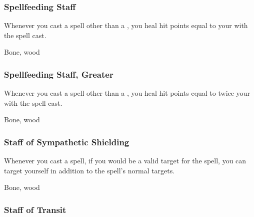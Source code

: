 
\lowercase{\hypertarget{item:Spellfeeding Staff}{}}\label{item:Spellfeeding Staff}
\hypertarget{item:Spellfeeding Staff}{\subsubsection{Spellfeeding Staff\hfill{}}}

Whenever you cast a spell other than a , you heal hit points equal to your  with the spell cast.



 


 Bone, wood


\lowercase{\hypertarget{item:Spellfeeding Staff, Greater}{}}\label{item:Spellfeeding Staff, Greater}
\hypertarget{item:Spellfeeding Staff, Greater}{\subsubsection{Spellfeeding Staff, Greater\hfill{}}}

Whenever you cast a spell other than a , you heal hit points equal to twice your  with the spell cast.



 


 Bone, wood


\lowercase{\hypertarget{item:Staff of Sympathetic Shielding}{}}\label{item:Staff of Sympathetic Shielding}
\hypertarget{item:Staff of Sympathetic Shielding}{\subsubsection{Staff of Sympathetic Shielding\hfill{}}}

Whenever you cast a   spell, if you would be a valid target for the spell, you can target yourself in addition to the spell's normal targets.



 


 Bone, wood


\lowercase{\hypertarget{item:Staff of Transit}{}}\label{item:Staff of Transit}
\hypertarget{item:Staff of Transit}{\subsubsection{Staff of Transit\hfill{}}}


